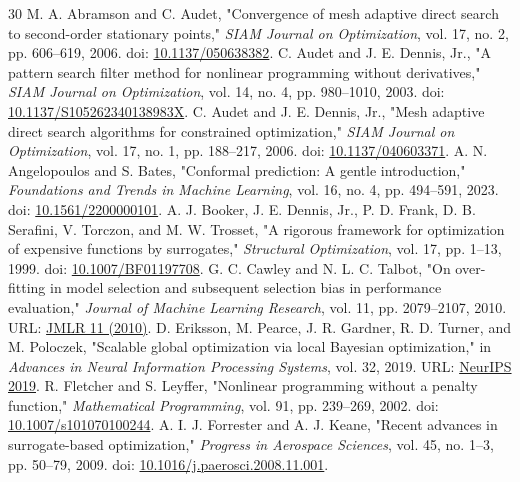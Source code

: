 \documentclass[10pt]{article}
\begin{document}
\begin{thebibliography}{30}
 M. A. Abramson and C. Audet, "Convergence of mesh adaptive direct search to second-order stationary points," \emph{SIAM Journal on Optimization}, vol. 17, no. 2, pp. 606--619, 2006. doi: \href{https://doi.org/10.1137/050638382}{10.1137/050638382}.
 C. Audet and J. E. Dennis, Jr., "A pattern search filter method for nonlinear programming without derivatives," \emph{SIAM Journal on Optimization}, vol. 14, no. 4, pp. 980--1010, 2003. doi: \href{https://doi.org/10.1137/S105262340138983X}{10.1137/S105262340138983X}.
 C. Audet and J. E. Dennis, Jr., "Mesh adaptive direct search algorithms for constrained optimization," \emph{SIAM Journal on Optimization}, vol. 17, no. 1, pp. 188--217, 2006. doi: \href{https://doi.org/10.1137/040603371}{10.1137/040603371}.
 A. N. Angelopoulos and S. Bates, "Conformal prediction: A gentle introduction," \emph{Foundations and Trends in Machine Learning}, vol. 16, no. 4, pp. 494--591, 2023. doi: \href{https://doi.org/10.1561/2200000101}{10.1561/2200000101}.
 A. J. Booker, J. E. Dennis, Jr., P. D. Frank, D. B. Serafini, V. Torczon, and M. W. Trosset, "A rigorous framework for optimization of expensive functions by surrogates," \emph{Structural Optimization}, vol. 17, pp. 1--13, 1999. doi: \href{https://doi.org/10.1007/BF01197708}{10.1007/BF01197708}.
 G. C. Cawley and N. L. C. Talbot, "On over-fitting in model selection and subsequent selection bias in performance evaluation," \emph{Journal of Machine Learning Research}, vol. 11, pp. 2079--2107, 2010. URL: \href{https://www.jmlr.org/papers/v11/cawley10a.html}{JMLR 11 (2010)}.
 D. Eriksson, M. Pearce, J. R. Gardner, R. D. Turner, and M. Poloczek, "Scalable global optimization via local Bayesian optimization," in \emph{Advances in Neural Information Processing Systems}, vol. 32, 2019. URL: \href{https://proceedings.neurips.cc/paper/2019/hash/6c990b7aca7bc7058f5e98ea909e924b-Abstract.html}{NeurIPS 2019}.
 R. Fletcher and S. Leyffer, "Nonlinear programming without a penalty function," \emph{Mathematical Programming}, vol. 91, pp. 239--269, 2002. doi: \href{https://doi.org/10.1007/s101070100244}{10.1007/s101070100244}.
 A. I. J. Forrester and A. J. Keane, "Recent advances in surrogate-based optimization," \emph{Progress in Aerospace Sciences}, vol. 45, no. 1--3, pp. 50--79, 2009. doi: \href{https://doi.org/10.1016/j.paerosci.2008.11.001}{10.1016/j.paerosci.2008.11.001}.

\end{thebibliography}
\end{document}
